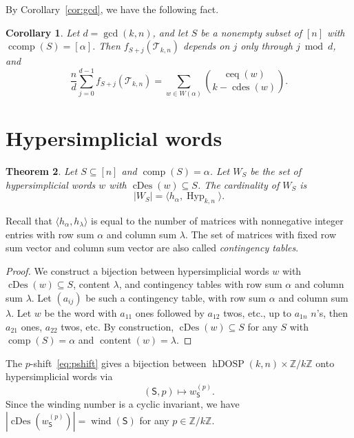 \documentclass[12pt,reqno]{amsart}
\theoremstyle{plain}
\newtheorem{theorem}{Theorem}[section]
\newtheorem{corollary}[theorem]{Corollary}
\theoremstyle{definition}
\newcommand{\Z}{\mathbb{Z}}
\newcommand{\Tri}{\mathcal{T}_{k,n}}
\newcommand{\dosp}{\mathsf{S}}
\DeclareMathOperator{\comp}{comp}
\DeclareMathOperator{\ccomp}{ccomp}
\DeclareMathOperator{\Hyp}{Hyp}
\DeclareMathOperator{\cDes}{cDes}
\DeclareMathOperator{\wind}{wind}
\DeclareMathOperator{\hDOSP}{hDOSP}
\DeclareMathOperator{\cdes}{cdes}
\DeclareMathOperator{\ceq}{ceq}
\DeclareMathOperator{\content}{content}
\begin{document}
By Corollary~\ref{cor:gcd}, we have the following fact.
\begin{corollary}
	Let $ d = \gcd(k,n) $, and let $ S $
	be a nonempty subset of $ [n] $ with $
		\ccomp(S) = [\alpha] $. Then $ f_{S+j}(\Tri) $ depends on $ j $ only through $ j \bmod d $, and
	\begin{equation}
		\frac{n}{d} \sum_{j=0}^{d-1} f_{S+j}(\Tri) = \sum_{w \in W(\alpha)} \binom{\ceq(w)}{k - \cdes(w)}.
	\end{equation}
\end{corollary}

\section{Hypersimplicial words}\label{sec:hypwords}

\begin{theorem}\label{thm:contingency}
	Let $ S \subseteq [n] $ and $
		\comp(S) = \alpha $. Let $ W_S $
	be the set of hypersimplicial words $ w $ with $\cDes(w) \subseteq S $.
	The cardinality of $ W_S $ is
	\begin{equation}
		|W_S| = \langle h_\alpha, \Hyp_{k,n} \rangle.
	\end{equation}
\end{theorem}
Recall that $\langle h_\alpha, h_\lambda \rangle$ is equal to the number of matrices with nonnegative integer entries with row sum $\alpha$ and column sum $\lambda$. The set of matrices with fixed row sum vector and column sum vector are also called \emph{contingency tables}.
\begin{proof}
	We construct a bijection between hypersimplicial words $w$ with $\cDes(w) \subseteq S$, content $\lambda$, and contingency tables with row sum $\alpha$ and column sum $\lambda$.
	Let $(a_{ij})$ be such a contingency table, with row sum $\alpha$ and column sum $\lambda$.
	Let $w$ be the word with $a_{11}$ ones followed by $a_{12}$ twos, etc., up to $a_{1n}$ $n$'s, then $a_{21}$ ones, $a_{22}$ twos, etc.
	By construction, $\cDes(w) \subseteq S$ for any $S$ with $\comp(S) = \alpha$ and $\content(w) = \lambda$.
\end{proof}

The $p$-shift~\eqref{eq:pshift} gives a bijection between $\hDOSP(k,n) \times \Z/k\Z $ onto hypersimplicial words via
\[
	(\dosp,p) \mapsto w_\dosp^{(p)}.
\]
Since the winding number is a cyclic invariant, we have $ |\cDes(w_\dosp^{(p)})| = \wind(\dosp) $ for any $ p \in \Z/k\Z $.
\end{document}
